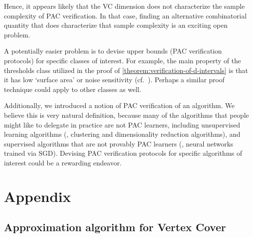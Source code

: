 Hence, it appears likely that the VC dimension does not characterize the sample complexity of PAC verification. In that case, finding an alternative combinatorial quantity that does characterize that sample complexity is an exciting open problem. 

A potentially easier problem is to devise upper bounds (PAC verification protocols) for specific classes of interest. For example, the main property of the thresholds class utilized in the proof of \cref{theorem:verification-of-d-intervals} is that it has low `surface area' or noise sensitivity (cf.\ \cite{BalcanBBY12}). Perhaps a similar proof technique could apply to other classes as well.

Additionally, we introduced a notion of PAC verification of an algorithm. We believe this is very natural definition, because many of the algorithms that people
might like to delegate in practice are not PAC learners, including unsupervised learning algorithms
(\eg, clustering and dimensionality reduction algorithms), and supervised algorithms that are not provably PAC learners (\eg, neural networks trained via SGD). Devising PAC verification protocols for specific algorithms of interest could be a rewarding endeavor.


%
%

%

%

%

%
\section{Appendix}   %

%

%

%
%
\subsection{Approximation algorithm for Vertex Cover} %

